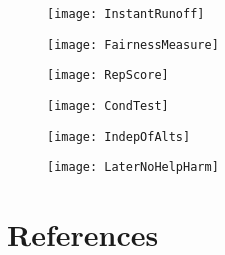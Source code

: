 \documentclass[12pt]{article}
\begin{document}
\begin{centering}
\begin{figure}[H]
\centering
\texttt{[image: InstantRunoff]}
\end{figure}

\begin{figure}[H]
\centering
\texttt{[image: FairnessMeasure]}
\end{figure}

\begin{figure}[H]
\centering
\texttt{[image: RepScore]}
\end{figure}

\begin{figure}[H]
\centering
\texttt{[image: CondTest]}
\end{figure}

\begin{figure}[H]
\centering
\texttt{[image: IndepOfAlts]}
\end{figure}

\begin{figure}[H]
\centering
\texttt{[image: LaterNoHelpHarm]}
\end{figure}

\end{centering}
\normalsize

\newpage
\section{References} \label{References}

\printbibliography[title={\tiny{\textcolor{white}{\cite{polcomp}\cite{anes}\cite{cses}\cite{ideahand}}}}]
\end{document}
